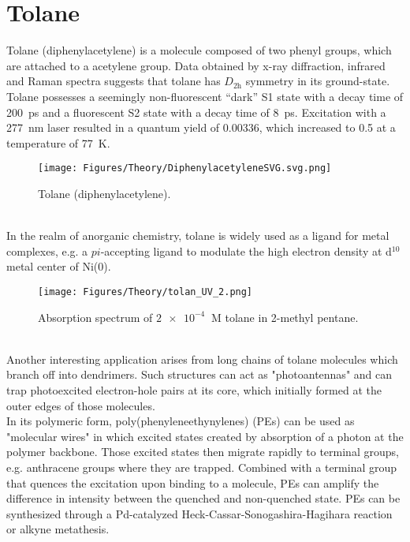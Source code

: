 \section{Tolane}
Tolane (diphenylacetylene) is a molecule composed of two phenyl groups, which are attached to a acetylene group. Data obtained by x-ray diffraction\cite{tol_xray}, infrared\cite{tol_infra} and Raman\cite{tol_raman} spectra suggests that tolane has $D_{2\mathrm{h}}$ symmetry in its ground-state. Tolane possesses a seemingly non-fluorescent ``dark'' S1 state with a decay time of \SI{200}{\pico\second}
and a fluorescent S2 state with a decay time of \SI{8}{\pico\second}.\cite{tol_states} Excitation with a \SI{277}{\nano\meter} laser resulted in a quantum yield of 0.00336, which increased to 0.5 at a temperature of \SI{77}{K}.\cite{tol_1}
%
%
\begin{figure}[h]
\centering
\texttt{[image: Figures/Theory/DiphenylacetyleneSVG.svg.png]}
\caption{Tolane (diphenylacetylene).}
\label{fig:tolane}
\end{figure}\\
%
In the realm of anorganic chemistry, tolane is widely used as a ligand for metal complexes, e.g. a $pi$-accepting ligand to modulate the high electron density at d$^{10}$ metal center of Ni(0).\cite{tol_ligand} \\
%
\begin{figure}[h]
\centering
\texttt{[image: Figures/Theory/tolan\_UV\_2.png]}
\caption{Absorption spectrum of $\SI{2e-4}{}$ M tolane in 2-methyl pentane.\cite{tol_uv_spec}}
\label{fig:tolane_UV}
\end{figure}\\
%
Another interesting application arises from long chains of tolane molecules which branch off into dendrimers. 
Such structures can act as "photoantennas" and can trap photoexcited electron-hole pairs at its core, which initially formed at the outer edges of those molecules.\cite{tol_dendrimer}\\
In its polymeric form, poly(phenyleneethynylenes) (PEs) can be used as "molecular wires" in which excited states created by absorption of a photon at the polymer backbone.\cite{swager1998molecular}
Those excited states then migrate rapidly to terminal groups, e.g. anthracene groups where they are trapped.
Combined with a terminal group that quences the excitation upon binding to a molecule, PEs can amplify the difference in intensity between the quenched and non-quenched state.\cite{swager1998molecular}
PEs can be synthesized through a Pd-catalyzed Heck-Cassar-Sonogashira-Hagihara reaction or alkyne metathesis.\cite{Bunz2001}


